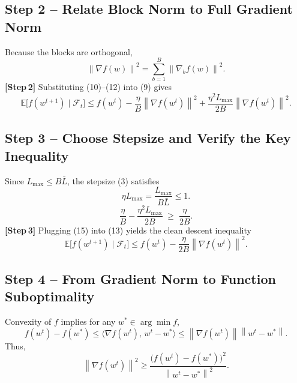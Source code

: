 \documentclass{article}
\newcommand{\E}{\mathbb{E}}
\newcommand{\norm}[1]{\left\lVert#1\right\rVert}
\begin{document}
\subsection*{Step 2 – Relate Block Norm to Full Gradient Norm}
Because the blocks are orthogonal,
\[
\norm{\nabla f(w)}^{2}
=\sum_{b=1}^{B}\norm{\nabla_{b}f(w)}^{2}.
\tag{12}
\]
\textbf{[Step 2]} Substituting (10)–(12) into (9) gives
\[
\E\!\bigl[f(w^{t+1})\mid\mathcal{F}_{t}\bigr]
\le f(w^{t})-\frac{\eta}{B}\norm{\nabla f(w^{t})}^{2}
+\frac{\eta^{2}L_{\max}}{2B}\norm{\nabla f(w^{t})}^{2}.
\tag{13}
\]

\subsection*{Step 3 – Choose Stepsize and Verify the Key Inequality}
Since $L_{\max}\le B\bar L$, the stepsize (3) satisfies
\[
\eta L_{\max}
=\frac{L_{\max}}{B\bar L}
\le 1 .
\tag{14}
\]
\[
\frac{\eta}{B}-\frac{\eta^{2}L_{\max}}{2B}
\;\ge\;\frac{\eta}{2B}.
\tag{15}
\]
\textbf{[Step 3]} Plugging (15) into (13) yields the clean descent inequality
\[
\E\!\bigl[f(w^{t+1})\mid\mathcal{F}_{t}\bigr]
\le f(w^{t})-\frac{\eta}{2B}\norm{\nabla f(w^{t})}^{2}.
\tag{16}
\]

\subsection*{Step 4 – From Gradient Norm to Function Suboptimality}
Convexity of $f$ implies for any $w^{*}\in\arg\min f$,
\[
f(w^{t})-f(w^{*})\le\langle\nabla f(w^{t}),\,w^{t}-w^{*}\rangle
\le\norm{\nabla f(w^{t})}\norm{w^{t}-w^{*}}.
\tag{17}
\]
Thus,
\[
\norm{\nabla f(w^{t})}^{2}
\ge\frac{\bigl(f(w^{t})-f(w^{*})\bigr)^{2}}{\norm{w^{t}-w^{*}}^{2}}.
\tag{18}
\]
\end{document}
